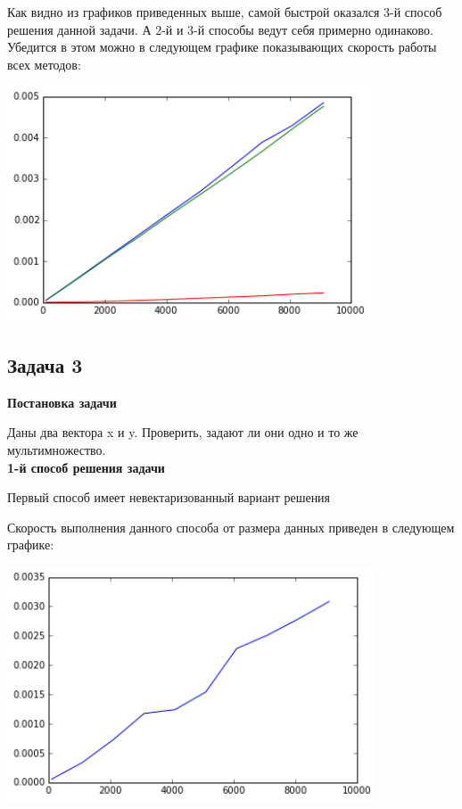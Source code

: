 \documentclass[12pt, a4paper]{article}
\begin{document}
				Как видно из графиков приведенных выше, самой быстрой оказался 3-й способ решения данной задачи. А 2-й и 3-й способы ведут себя примерно одинаково. Убедится в этом можно в следующем графике показывающих скорость работы всех методов:
				\begin{center}
					\includegraphics[height=7cm]{timeit/num2_ti123.png}
				\end{center}



		\newpage
		\subsection{Задача 3}

			{\bf Постановка задачи\\}

				Даны два вектора x и y. Проверить, задают ли они одно и то же мультимножество. \\

				{\bf 1-й способ решения задачи\\}

				Первый способ имеет невектаризованный вариант решения

				Скорость выполнения данного способа от размера данных приведен в следующем графике:
				\begin{center}
					\includegraphics[height=7cm]{timeit/num3_ti1.png}
				\end{center}
\end{document}
